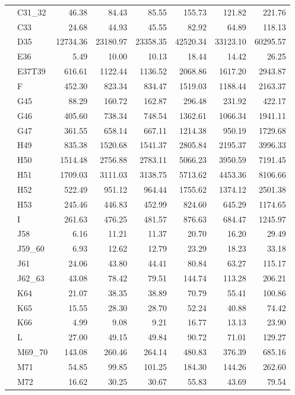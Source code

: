 \begin{tabular}{llrrrrrr}
 & C31\_32 & 46.38 & 84.43 & 85.55 & 155.73 & 121.82 & 221.76 \\
 & C33 & 24.68 & 44.93 & 45.55 & 82.92 & 64.89 & 118.13 \\
 & D35 & 12734.36 & 23180.97 & 23358.35 & 42520.34 & 33123.10 & 60295.57 \\
 & E36 & 5.49 & 10.00 & 10.13 & 18.44 & 14.42 & 26.25 \\
 & E37T39 & 616.61 & 1122.44 & 1136.52 & 2068.86 & 1617.20 & 2943.87 \\
 & F & 452.30 & 823.34 & 834.47 & 1519.03 & 1188.44 & 2163.37 \\
 & G45 & 88.29 & 160.72 & 162.87 & 296.48 & 231.92 & 422.17 \\
 & G46 & 405.60 & 738.34 & 748.54 & 1362.61 & 1066.34 & 1941.11 \\
 & G47 & 361.55 & 658.14 & 667.11 & 1214.38 & 950.19 & 1729.68 \\
 & H49 & 835.38 & 1520.68 & 1541.37 & 2805.84 & 2195.37 & 3996.33 \\
 & H50 & 1514.48 & 2756.88 & 2783.11 & 5066.23 & 3950.59 & 7191.45 \\
 & H51 & 1709.03 & 3111.03 & 3138.75 & 5713.62 & 4453.36 & 8106.66 \\
 & H52 & 522.49 & 951.12 & 964.44 & 1755.62 & 1374.12 & 2501.38 \\
 & H53 & 245.46 & 446.83 & 452.99 & 824.60 & 645.29 & 1174.65 \\
 & I & 261.63 & 476.25 & 481.57 & 876.63 & 684.47 & 1245.97 \\
 & J58 & 6.16 & 11.21 & 11.37 & 20.70 & 16.20 & 29.49 \\
 & J59\_60 & 6.93 & 12.62 & 12.79 & 23.29 & 18.23 & 33.18 \\
 & J61 & 24.06 & 43.80 & 44.41 & 80.84 & 63.27 & 115.17 \\
 & J62\_63 & 43.08 & 78.42 & 79.51 & 144.74 & 113.28 & 206.21 \\
 & K64 & 21.07 & 38.35 & 38.89 & 70.79 & 55.41 & 100.86 \\
 & K65 & 15.55 & 28.30 & 28.70 & 52.24 & 40.88 & 74.42 \\
 & K66 & 4.99 & 9.08 & 9.21 & 16.77 & 13.13 & 23.90 \\
 & L & 27.00 & 49.15 & 49.84 & 90.72 & 71.01 & 129.27 \\
 & M69\_70 & 143.08 & 260.46 & 264.14 & 480.83 & 376.39 & 685.16 \\
 & M71 & 54.85 & 99.85 & 101.25 & 184.30 & 144.26 & 262.60 \\
 & M72 & 16.62 & 30.25 & 30.67 & 55.83 & 43.69 & 79.54 \\

\end{tabular}
